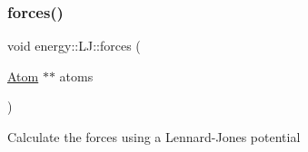 \subsubsection{\texorpdfstring{forces()}{forces()}}
{\footnotesize\ttfamily void energy\+::\+L\+J\+::forces (\begin{DoxyParamCaption}\item[{\mbox{\hyperlink{class_atom}{Atom}} $\ast$$\ast$}]{atoms }\end{DoxyParamCaption})\hspace{0.3cm}{\ttfamily [inline]}}

Calculate the forces using a Lennard-\/\+Jones potential